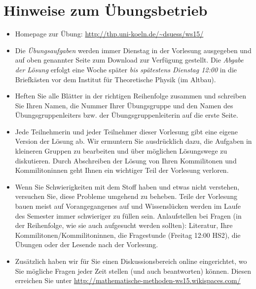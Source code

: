 \documentclass[11pt]{scrartcl}
\begin{document}
\maketitle

\section*{Hinweise zum Übungsbetrieb}
\begin{itemize}
  \item Homepage zur Übung: \url{http://thp.uni-koeln.de/~dsuess/ws15/}
  \item Die \emph{Übungsaufgaben} werden immer Dienstag in der Vorlesung ausgegeben und auf oben genannter Seite zum Download zur Verfügung gestellt. Die \emph{Abgabe der Lösung} erfolgt eine Woche später \emph{bis spätestens Dienstag 12:00} in die Briefkästen vor dem Institut für Theoretische Physik (im Altbau).
  \item Heften Sie alle Blätter in der richtigen Reihenfolge zusammen und schreiben Sie Ihren Namen, die Nummer Ihrer Übungsgruppe und den Namen des Übungsgruppenleiters bzw. der Übungsgruppenleiterin auf die erste Seite.
  \item Jede Teilnehmerin und jeder Teilnehmer dieser Vorlesung gibt eine eigene Version der Lösung ab. Wir ermuntern Sie ausdrücklich dazu, die Aufgaben in kleineren Gruppen zu bearbeiten und über möglichen Lösungswege zu diskutieren. Durch Abschreiben der Lösung von Ihren Kommilitonen und Kommilitoninnen geht Ihnen ein wichtiger Teil der Vorlesung verloren.
  \item Wenn Sie Schwierigkeiten mit dem Stoff haben und etwas nicht verstehen, versuchen Sie, diese Probleme umgehend zu beheben. Teile der Vorlesung bauen meist auf Vorangegangenes auf und Wissenslücken werden im Laufe des Semester immer schwieriger zu füllen sein. Anlaufstellen bei Fragen (in der Reihenfolge, wie sie auch aufgesucht werden sollten): Literatur, Ihre Kommilitonen/Kommilitoninnen, die Fragestunde (Freitag 12:00 HS2), die Übungen oder der Lesende nach der Vorlesung.
  \item Zusätzlich haben wir für Sie einen Diskussionsbereich online eingerichtet, wo Sie mögliche Fragen jeder Zeit stellen (und auch beantworten) können. Diesen erreichen Sie unter \url{http://mathematische-methoden-ws15.wikispaces.com/}
\end{itemize}
\end{document}
